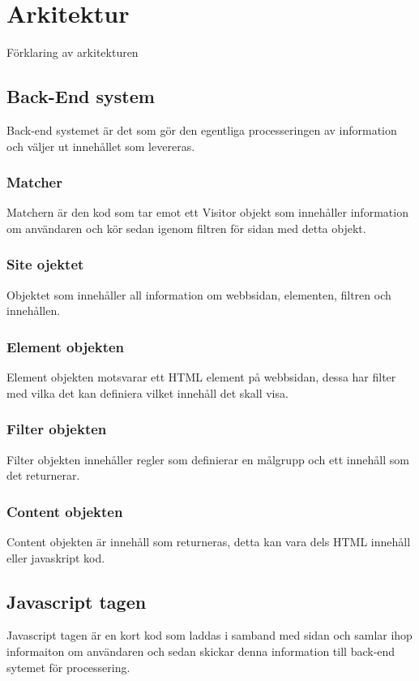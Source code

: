 \section{Arkitektur}

Förklaring av arkitekturen

\subsection{Back-End system}

Back-end systemet är det som gör den egentliga processeringen av information och väljer ut innehållet som levereras.

\subsubsection{Matcher}

Matchern är den kod som tar emot ett Visitor objekt som innehåller information om användaren och kör sedan igenom filtren för sidan med detta objekt.

\subsubsection{Site ojektet}

Objektet som innehåller all information om webbsidan, elementen, filtren och innehållen.

\subsubsection{Element objekten}

Element objekten motsvarar ett HTML element på webbsidan, dessa har filter med vilka det kan definiera vilket innehåll det skall visa.

\subsubsection{Filter objekten}

Filter objekten innehåller regler som definierar en målgrupp och ett innehåll som det returnerar.

\subsubsection{Content objekten}

Content objekten är innehåll som returneras, detta kan vara dels HTML innehåll eller javaskript kod.

\subsection{Javascript tagen}

Javascript tagen är en kort kod som laddas i samband med sidan och samlar ihop informaiton om användaren och sedan skickar denna information till back-end sytemet för processering.


